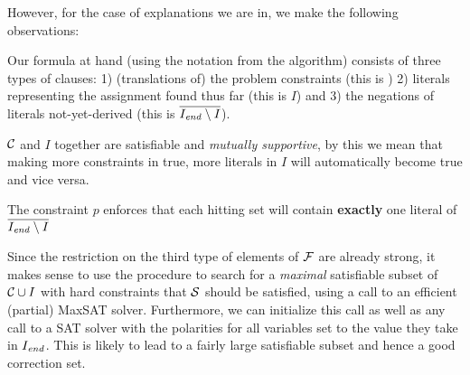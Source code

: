 However, for the case of explanations we are in, we make the following observations: 
\begin{compactitem}
 \item Our formula at hand (using the notation from the \onestepo algorithm) consists of three types of clauses: 1) (translations of) the problem constraints (this is \formulac) 2) literals representing the assignment found thus far (this is $I$) and 3) the negations of literals not-yet-derived (this is $\overline{I_\mathit{end} \setminus I}$). 
 \item $\mathcal{C} $ and $I$ together are satisfiable and \emph{mutually supportive}, by this we mean that making more constraints in \formulac true, more literals in $I$ will automatically become true and vice versa. 
 \item The constraint $p$ enforces that each hitting set will contain \textbf{exactly} one literal of  $\overline{I_\mathit{end} \setminus I}$
\end{compactitem}
Since the restriction on the third type of elements of $\mathcal{F} $ are already strong, it makes sense to use the \grow procedure to search for a \emph{maximal} satisfiable subset of $\mathcal{C} \cup I$ with hard constraints that $\mathcal{S}$ should be satisfied, using a call to an efficient  (partial) MaxSAT solver. Furthermore, we can initialize this call as well as any call to a SAT solver with the polarities for all variables set to the value they take in $I_\mathit{end} $. This is likely to lead to a fairly large satisfiable subset and hence a good correction set. 






